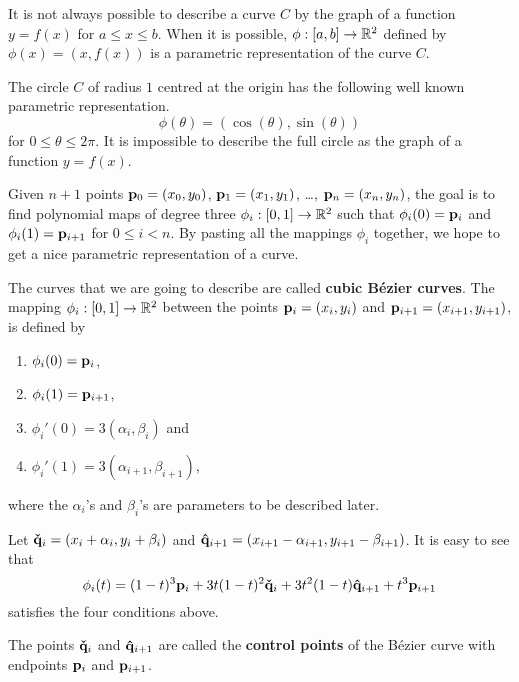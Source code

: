 It is not always possible to describe a curve $C$ by the graph of a
function $y=f(x)$ for $a\leq x \leq b$.  When it is possible,
$\phi:[a,b]\to \mathbb{R}^2$ defined by $\phi(x) = (x,f(x))$ is a parametric
representation of the curve $C$.

\begin{egg}
The circle $C$ of radius $1$ centred at the origin has the following
well known parametric representation.
\[
\phi(\theta) = (\cos(\theta),\sin(\theta))
\]
for $0 \leq \theta \leq 2 \pi$.  It is impossible to describe the full
circle as the graph of a function $y=f(x)$.
\end{egg}

Given $n+1$ points $\mathbf{p}_0 = (x_0,y_0)$, $\mathbf{p}_1 = (x_1,y_1)$,
\ldots, $\mathbf{p}_n = (x_n,y_n)$, the goal is to find polynomial
maps of degree three $\phi_i:[0,1] \rightarrow \mathbb{R}^2$ such
that $\phi_i(0) = \mathbf{p}_i$ and $\phi_i(1) = \mathbf{p}_{i+1}$ for $0\leq i <n$.
By pasting all the mappings $\phi_i$ together, we hope to get a
nice parametric representation of a curve.

The curves that we are going to describe are called
{\bfseries cubic Bézier curves}.
The mapping $\phi_i:[0,1]\to \mathbb{R}^2$ between
the points $\mathbf{p}_i = (x_i,y_i)$ and $\mathbf{p}_{i+1} = (x_{i+1},y_{i+1})$,
is defined by
\begin{enumerate}
\item $\phi_i(0) = \mathbf{p}_i$,
\item $\phi_i(1) = \mathbf{p}_{i+1}$,
\item $\phi_i'(0) = 3(\alpha_i,\beta_i)$ and
\item $\phi_i'(1) = 3(\alpha_{i+1}, \beta_{i+1})$,
\end{enumerate}
where the $\alpha_i$'s and $\beta_i$'s are parameters to be described
later.

Let $\mathbf{\check{q}}_i=(x_i+\alpha_i,y_i+\beta_i)$ and
$\mathbf{\hat{q}}_{i+1}=(x_{i+1}-\alpha_{i+1},y_{i+1}-\beta_{i+1})$.
It is easy to see that
\begin{equation}\label{Bez_form1}
\mathbf{\phi}_i(t) = (1-t)^3 \mathbf{p}_i + 3t(1-t)^2 \mathbf{\check{q}}_i
+ 3t^2(1-t) \mathbf{\hat{q}}_{i+1} + t^3 \mathbf{p}_{i+1}
\end{equation}
satisfies the four conditions above.

The points $\mathbf{\check{q}}_i$ and $\mathbf{\hat{q}}_{i+1}$ are called
the {\bfseries control points}
of the Bézier curve with endpoints $\mathbf{p}_i$ and $\mathbf{p}_{i+1}$.

